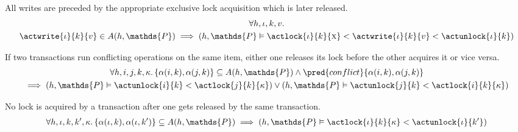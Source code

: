 \lem \label{lem:write} All writes are preceded by the appropriate exclusive lock acquisition which is later released.
\begin{gather*}
\forall h, \iota, k, v \ldotp \\
\actwrite{\iota}{k}{v} \in A(h, \mathds{P}) \implies \left( h, \mathds{P} \vDash \actlock{\iota}{k}{\textsc{x}} < \actwrite{\iota}{k}{v} < \actunlock{\iota}{k} \right)
\end{gather*}

\lem If two transactions run conflicting operations on the same item, either one releases its lock before the other acquires it or vice versa.
\begin{gather*}
\forall h, i, j, k, \kappa \ldotp 
\{ \alpha(i, k), \alpha(j, k) \} \subseteq A(h, \mathds{P}) \land \pred{conflict}{\alpha(i, k), \alpha(j, k)} 
\\
\implies \left( h, \mathds{P} \vDash \actunlock{i}{k} < \actlock{j}{k}{\kappa} \right) \lor \left( h, \mathds{P} \vDash \actunlock{j}{k} < \actlock{i}{k}{\kappa} \right)
\end{gather*}

\lem No lock is acquired by a transaction after one gets released by the same transaction.
\begin{gather*}
\forall h, \iota, k, k', \kappa \ldotp 
\{ \alpha(\iota, k), \alpha(\iota, k') \} \subseteq A(h, \mathds{P})
\implies \left( h, \mathds{P} \vDash \actlock{\iota}{k}{\kappa} < \actunlock{\iota}{k'} \right)
\end{gather*}

